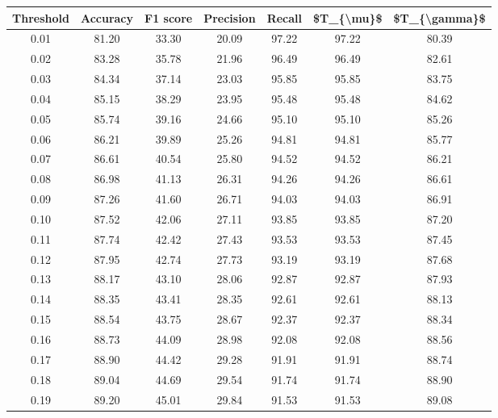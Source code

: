 \begin{tabular}{|c|c|c|c|c|c|c|}
\hline
 Threshold &  Accuracy &  F1 score &  Precision &  Recall &  \$T\_\{\textbackslash mu\}\$ &  \$T\_\{\textbackslash gamma\}\$ \\
\hline
      0.01 &     81.20 &     33.30 &      20.09 &   97.22 &      97.22 &         80.39 \\
      0.02 &     83.28 &     35.78 &      21.96 &   96.49 &      96.49 &         82.61 \\
      0.03 &     84.34 &     37.14 &      23.03 &   95.85 &      95.85 &         83.75 \\
      0.04 &     85.15 &     38.29 &      23.95 &   95.48 &      95.48 &         84.62 \\
      0.05 &     85.74 &     39.16 &      24.66 &   95.10 &      95.10 &         85.26 \\
      0.06 &     86.21 &     39.89 &      25.26 &   94.81 &      94.81 &         85.77 \\
      0.07 &     86.61 &     40.54 &      25.80 &   94.52 &      94.52 &         86.21 \\
      0.08 &     86.98 &     41.13 &      26.31 &   94.26 &      94.26 &         86.61 \\
      0.09 &     87.26 &     41.60 &      26.71 &   94.03 &      94.03 &         86.91 \\
      0.10 &     87.52 &     42.06 &      27.11 &   93.85 &      93.85 &         87.20 \\
      0.11 &     87.74 &     42.42 &      27.43 &   93.53 &      93.53 &         87.45 \\
      0.12 &     87.95 &     42.74 &      27.73 &   93.19 &      93.19 &         87.68 \\
      0.13 &     88.17 &     43.10 &      28.06 &   92.87 &      92.87 &         87.93 \\
      0.14 &     88.35 &     43.41 &      28.35 &   92.61 &      92.61 &         88.13 \\
      0.15 &     88.54 &     43.75 &      28.67 &   92.37 &      92.37 &         88.34 \\
      0.16 &     88.73 &     44.09 &      28.98 &   92.08 &      92.08 &         88.56 \\
      0.17 &     88.90 &     44.42 &      29.28 &   91.91 &      91.91 &         88.74 \\
      0.18 &     89.04 &     44.69 &      29.54 &   91.74 &      91.74 &         88.90 \\
      0.19 &     89.20 &     45.01 &      29.84 &   91.53 &      91.53 &         89.08 \\

\end{tabular}
